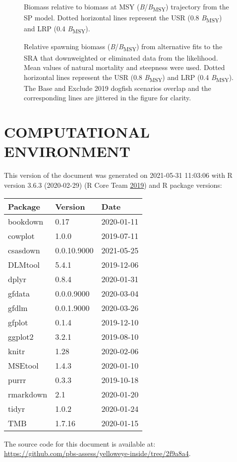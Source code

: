 \documentclass[11pt]{book}
\begin{document}
\begin{figure}[htb]

{\centering {} 

}

\caption{Biomass relative to biomass at MSY (\emph{B}/\emph{B}\textsubscript{MSY}) trajectory from the SP model. Dotted horizontal lines represent the USR (0.8 \emph{B}\textsubscript{MSY}) and LRP (0.4 \emph{B}\textsubscript{MSY}).}\label{fig:spm-biomass}
\end{figure}

\begin{figure}[htb]

{\centering {} 

}

\caption{Relative spawning biomass (\emph{B}/\emph{B}\textsubscript{MSY}) from alternative fits to the SRA that downweighted or eliminated data from the likelihood. Mean values of natural mortality and steepness were used. Dotted horizontal lines represent the USR (0.8 \emph{B}\textsubscript{MSY}) and LRP (0.4 \emph{B}\textsubscript{MSY}). The Base and Exclude 2019 dogfish scenarios overlap and the corresponding lines are jittered in the figure for clarity.}\label{fig:alt-SRA-fit}
\end{figure}
\clearpage

\hypertarget{computational-environment}{%
\section{COMPUTATIONAL ENVIRONMENT}\label{computational-environment}}

This version of the document was generated on 2021-05-31 11:03:06 with R version 3.6.3 (2020-02-29) (R Core Team \protect\hyperlink{ref-r2019}{2019}) and R package versions:
\begin{longtable}[]{@{}lll@{}}
\toprule
Package & Version & Date\tabularnewline
\midrule
\endhead
bookdown & 0.17 & 2020-01-11\tabularnewline
cowplot & 1.0.0 & 2019-07-11\tabularnewline
csasdown & 0.0.10.9000 & 2021-05-25\tabularnewline
DLMtool & 5.4.1 & 2019-12-06\tabularnewline
dplyr & 0.8.4 & 2020-01-31\tabularnewline
gfdata & 0.0.0.9000 & 2020-03-04\tabularnewline
gfdlm & 0.0.1.9000 & 2020-03-26\tabularnewline
gfplot & 0.1.4 & 2019-12-10\tabularnewline
ggplot2 & 3.2.1 & 2019-08-10\tabularnewline
knitr & 1.28 & 2020-02-06\tabularnewline
MSEtool & 1.4.3 & 2020-01-10\tabularnewline
purrr & 0.3.3 & 2019-10-18\tabularnewline
rmarkdown & 2.1 & 2020-01-20\tabularnewline
tidyr & 1.0.2 & 2020-01-24\tabularnewline
TMB & 1.7.16 & 2020-01-15\tabularnewline
\bottomrule
\end{longtable}
The source code for this document is available at:\\
\url{https://github.com/pbs-assess/yelloweye-inside/tree/2f9a8a4}.
\end{document}
